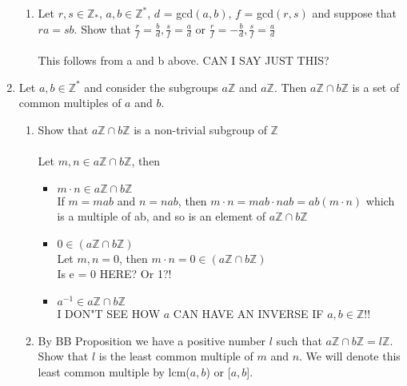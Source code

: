 \documentclass[11pt]{article}
\begin{document}
\begin{enumerate}
\begin{enumerate}
\item Let $r,s \in \mathbb{Z}_*$, $a,b \in \mathbb{Z}^*$, $d$ = gcd$(a,b)$, $f$ = gcd$(r,s)$ and suppose that $ra = sb$.  Show that $\tfrac{r}{f} = \tfrac{b}{d}, \tfrac{s}{f} = \tfrac{a}{d}$ or $\tfrac{r}{f} = -\tfrac{b}{d}, \tfrac{s}{f}=\tfrac{a}{d}$
\\
\\
This follows from a and b above.  CAN I SAY JUST THIS?
\end{enumerate}


\newpage %
\item Let $a, b \in \mathbb{Z}^*$ and consider the subgroups $a\mathbb{Z}$ and $a\mathbb{Z}$.  Then $a\mathbb{Z} \cap b\mathbb{Z}$ is a set of common multiples of $a$ and $b$.
\begin{enumerate}
\item Show that $a\mathbb{Z} \cap b\mathbb{Z}$ is a non-trivial subgroup of $\mathbb{Z}$
\\
\\
Let $m,n \in a\mathbb{Z} \cap b\mathbb{Z}$, then
\begin{itemize}
  \item $m \cdot n \in a\mathbb{Z} \cap b\mathbb{Z}$\\
  If $m = mab$ and $n = nab$, then $m \cdot n = mab \cdot nab = ab(m \cdot n)$ which is a multiple of ab, and so is an element of $a\mathbb{Z} \cap b\mathbb{Z}$\\
  \item $0 \in (a\mathbb{Z} \cap b\mathbb{Z})$\\
  Let $m,n = 0$, then $m \cdot n = 0 \in (a\mathbb{Z} \cap b\mathbb{Z})$\\
  Is e = 0 HERE?  Or 1?!
  \\
  \item $a^{-1} \in a\mathbb{Z} \cap b\mathbb{Z}$\\
  I DON"T SEE HOW $a$ CAN HAVE AN INVERSE IF $a,b \in \mathbb{Z}$!!
  
\end{itemize}
\item By BB Proposition we have a positive number $l$ such that $a\mathbb{Z} \cap b\mathbb{Z} = l\mathbb{Z}$.  Show that $l$ is the least common multiple of $m$ and $n$.  We will denote this least common multiple by lcm($a,b$) or [$a,b$].
\\
\\
\\\\
\\
\\
\\
\\


\end{enumerate}
\end{enumerate}
\end{document}
